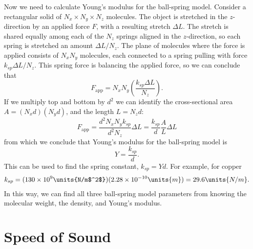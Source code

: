 Now we need to calculate Young's modulus for the ball-spring model.
Consider a rectangular solid of $N_x \times N_y \times N_z$ molecules.
The object is stretched in the $z$-direction by an applied force $F$,
with a resulting stretch $\Delta L$.  The stretch is shared equally
among each of the $N_z$ springs aligned in the $z$-direction, so each
spring is stretched an amount $\Delta L/N_z$.  The plane of molecules
where the force is applied consists of $N_xN_y$ molecules, each
connected to a spring pulling with force $k_{sp}\Delta L/N_z$.  This
spring force is balancing the applied force, so we can conclude that
\begin{equation}
F_\text{app}= N_xN_y \left(\frac{k_{sp} \Delta L}{N_z}\right).
\end{equation}
If we multiply top and bottom by $d^2$ we can identify the
cross-sectional area $A=(N_x d)(N_y d)$, and the length $L=N_z d$:
\begin{equation}
F_\text{app}=\frac{d^2N_xN_y k_{sp}}{d^2 N_z} \Delta L = \frac{k_{sp}}{d}
\frac{A}{L}\Delta L
\end{equation}
from which we conclude that Young's modulus for the ball-spring model
is
\begin{equation}
Y=\frac{k_{sp}}{d}.
\end{equation}
This can be used to find the spring constant, $k_{sp} = Yd$.  For
example, for copper
\begin{equation}
k_{sp} = (130\times 10^9\units{N/m$^2$})(2.28\times 10^{-10}\units{m})
 = 29.6\units{N/m}.
\end{equation}
In this way, we can find all three ball-spring model parameters from
knowing the molecular weight, the density, and Young's modulus.


\section{Speed of Sound}

